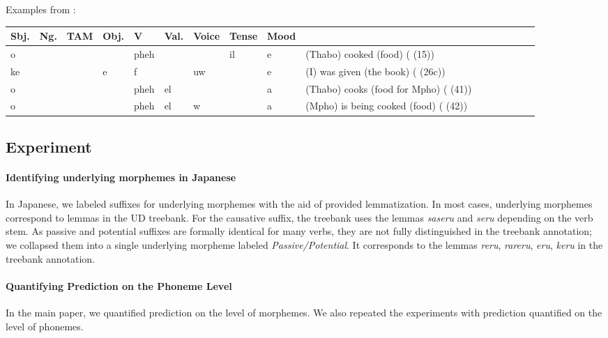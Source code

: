 \documentclass[11pt,letterpaper]{article}
\begin{document}
Examples from \cite{demuth1992acquisition}:

\begin{tabular}{lllllllll|lllllll}
Sbj. & Ng. & TAM & Obj. & V & Val. & Voice & Tense & Mood \\ \hline
o       &          &     &        & pheh &         &       & il    & e  & (Thabo) cooked (food) (\cite{demuth1992acquisition} (15)) \\
ke      &          &     & e      & f   &          & uw    &      & e   & (I) was given (the book) (\cite{demuth1992acquisition} (26c)) \\
o       &          &     &        & pheh & el      &      &       & a & (Thabo) cooks (food for Mpho) (\cite{demuth1992acquisition} (41))\\
o       &          &     &        & pheh & el      & w    &      & a & (Mpho) is being cooked (food) (\cite{demuth1992acquisition} (42))
\end{tabular}





\subsection{Experiment}

\paragraph{Identifying underlying morphemes in Japanese}
In Japanese, we labeled suffixes for underlying morphemes with the aid of provided lemmatization.
In most cases, underlying morphemes correspond to lemmas in the UD treebank.
For the causative suffix, the treebank uses the lemmas \textit{saseru} and \textit{seru} depending on the verb stem.
As passive and potential suffixes are formally identical for many verbs, they are not fully distinguished in the treebank annotation; we collapsed them into a single underlying morpheme labeled \textit{Passive/Potential}.
It corresponds to the lemmas \textit{reru}, \textit{rareru}, \textit{eru}, \textit{keru} in the treebank annotation.

\paragraph{Quantifying Prediction on the Phoneme Level}
In the main paper, we quantified prediction on the level of morphemes.
We also repeated the experiments with prediction quantified on the level of phonemes.
\end{document}
